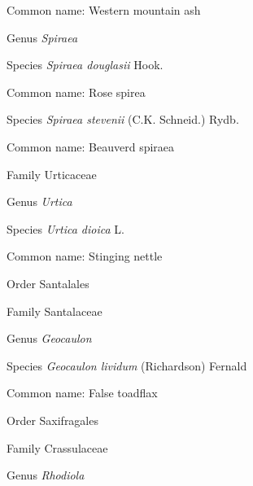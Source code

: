 \documentclass[9pt, article]{memoir}
\begin{document}
\begin{multicols}{2}
Common name: Western mountain ash

\vspace{6pt}\noindent\hspace{30pt}Genus \textit{Spiraea}


\vspace{6pt}\noindent\hspace{36pt}Species \textit{Spiraea douglasii} Hook.


Common name: Rose spirea

\vspace{6pt}\noindent\hspace{36pt}Species \textit{Spiraea stevenii} (C.K. Schneid.) Rydb.


Common name: Beauverd spiraea

\vspace{6pt}\noindent\hspace{24pt}Family Urticaceae


\vspace{6pt}\noindent\hspace{30pt}Genus \textit{Urtica}


\vspace{6pt}\noindent\hspace{36pt}Species \textit{Urtica dioica} L.


Common name: Stinging nettle

\vspace{6pt}\noindent\hspace{18pt}Order Santalales


\vspace{6pt}\noindent\hspace{24pt}Family Santalaceae


\vspace{6pt}\noindent\hspace{30pt}Genus \textit{Geocaulon}


\vspace{6pt}\noindent\hspace{36pt}Species \textit{Geocaulon lividum} (Richardson) Fernald


Common name: False toadflax

\vspace{6pt}\noindent\hspace{18pt}Order Saxifragales


\vspace{6pt}\noindent\hspace{24pt}Family Crassulaceae


\vspace{6pt}\noindent\hspace{30pt}Genus \textit{Rhodiola}



\end{multicols}
\end{document}
